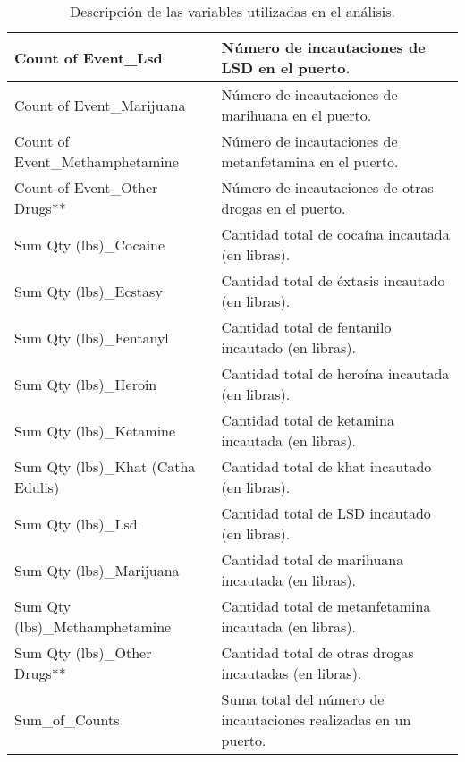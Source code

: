 \documentclass[12pt]{article}
\begin{document}
\begin{table}[H]
\begin{tabular}{|l|p{10cm}|}
				\hline
				Count of Event\_Lsd & Número de incautaciones de LSD en el puerto. \\ 
				\hline
				Count of Event\_Marijuana & Número de incautaciones de marihuana en el puerto. \\ 
				\hline
				Count of Event\_Methamphetamine & Número de incautaciones de metanfetamina en el puerto. \\ 
				\hline
				Count of Event\_Other Drugs** & Número de incautaciones de otras drogas en el puerto. \\ 
				\hline
				Sum Qty (lbs)\_Cocaine & Cantidad total de cocaína incautada (en libras). \\ 
				\hline
				Sum Qty (lbs)\_Ecstasy & Cantidad total de éxtasis incautado (en libras). \\ 
				\hline
				Sum Qty (lbs)\_Fentanyl & Cantidad total de fentanilo incautado (en libras). \\ 
				\hline
				Sum Qty (lbs)\_Heroin & Cantidad total de heroína incautada (en libras). \\ 
				\hline
				Sum Qty (lbs)\_Ketamine & Cantidad total de ketamina incautada (en libras). \\ 
				\hline
				Sum Qty (lbs)\_Khat (Catha Edulis) & Cantidad total de khat incautado (en libras). \\ 
				\hline
				Sum Qty (lbs)\_Lsd & Cantidad total de LSD incautado (en libras). \\ 
				\hline
				Sum Qty (lbs)\_Marijuana & Cantidad total de marihuana incautada (en libras). \\ 
				\hline
				Sum Qty (lbs)\_Methamphetamine & Cantidad total de metanfetamina incautada (en libras). \\ 
				\hline
				Sum Qty (lbs)\_Other Drugs** & Cantidad total de otras drogas incautadas (en libras). \\ 
				\hline
				Sum\_of\_Counts & Suma total del número de incautaciones realizadas en un puerto. \\ 
				\hline
			\end{tabular}
			\caption{Descripción de las variables utilizadas en el análisis.}
			\label{tab:variables_description}
		\end{table}
		
		
		
\end{document}
